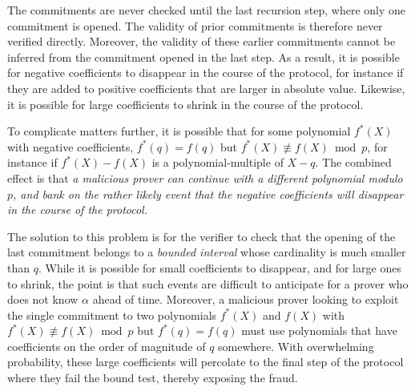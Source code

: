 The commitments are never checked until the last recursion step, where only one commitment is opened. The validity of prior commitments is therefore never verified directly. Moreover, the validity of these earlier commitments cannot be inferred from the commitment opened in the last step. As a result, it is possible for negative coefficients to disappear in the course of the protocol, for instance if they are added to positive coefficients that are larger in absolute value. Likewise, it is possible for large coefficients to shrink in the course of the protocol.

To complicate matters further, it is possible that for some polynomial $f^*(X)$ with negative coefficients, $f^*(q) = f(q)$ but $f^*(X) \not \equiv f(X) \bmod p$, for instance if $f^*(X) - f(X)$ is a polynomial-multiple of $X-q$. The combined effect is that \emph{a malicious prover can continue with a different polynomial modulo $p$, and bank on the rather likely event that the negative coefficients will disappear in the course of the protocol.}

The solution to this problem is for the verifier to check that the opening of the last commitment belongs to a \emph{bounded interval} whose cardinality is much smaller than $q$. While it is possible for small coefficients to disappear, and for large ones to shrink, the point is that such events are difficult to anticipate for a prover who does not know $\alpha$ ahead of time. Moreover, a malicious prover looking to exploit the single commitment to two polynomials $f^*(X)$ and $f(X)$ with $f^*(X) \not \equiv f(X) \bmod p$ but $f^*(q) = f(q)$ must use polynomials that have coefficients on the order of magnitude of $q$ somewhere. With overwhelming probability, these large coefficients will percolate to the final step of the protocol where they fail the bound test, thereby exposing the fraud.



